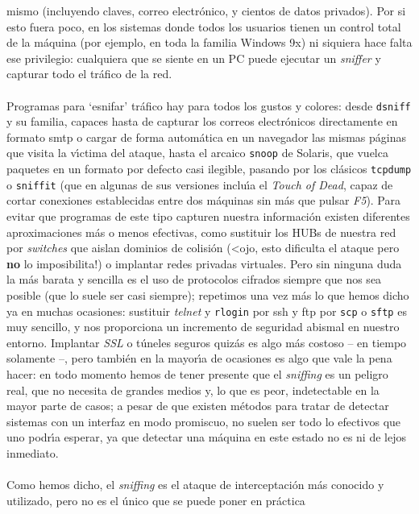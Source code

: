mismo (incluyendo claves, correo electr\'onico, y cientos de datos privados). 
Por si esto fuera poco, en los sistemas donde todos los usuarios tienen un 
control total de la m\'aquina (por ejemplo, en toda la familia Windows 9x) ni 
siquiera hace falta ese privilegio: cualquiera que se siente en un PC puede
ejecutar un {\it sniffer} y capturar todo el tr\'afico de la red.\\
\\Programas para `esnifar' tr\'afico hay para todos los gustos y colores: desde
{\tt dsniff} y su familia, capaces hasta de capturar los correos electr\'onicos
directamente en formato {\sc smtp} o cargar de forma autom\'atica en un 
navegador las mismas p\'aginas que visita
la v\'{\i}ctima del ataque, hasta el arcaico {\tt snoop} de Solaris, que vuelca
paquetes en un formato por defecto casi ilegible, pasando por los cl\'asicos
{\tt tcpdump} o {\tt sniffit} (que en algunas de sus versiones inclu\'{\i}a el
{\it Touch of Dead}, capaz de cortar conexiones establecidas entre dos 
m\'aquinas sin m\'as que pulsar {\it F5}). Para evitar que programas de este
tipo capturen nuestra informaci\'on existen diferentes aproximaciones m\'as o
menos efectivas, como sustituir los HUBs de nuestra red por {\it switches} que
aislan dominios de colisi\'on (<ojo, esto dificulta el ataque pero {\bf no} lo
imposibilita!) o implantar redes privadas virtuales. Pero sin ninguna duda la 
m\'as barata y sencilla es el uso de protocolos cifrados siempre que nos sea
posible (que lo suele ser casi siempre); repetimos una vez m\'as lo que hemos
dicho ya en muchas ocasiones: sustituir {\it telnet} y {\tt rlogin} por {\sc
ssh} y {\sc ftp} por {\tt scp} o {\tt sftp} es muy sencillo, y nos proporciona 
un incremento de seguridad abismal en nuestro entorno. Implantar {\it SSL} o
t\'uneles seguros quiz\'as es algo m\'as costoso -- en tiempo solamente --, 
pero tambi\'en en la mayor\'{\i}a de ocasiones es algo que vale la pena hacer:
en todo momento hemos de tener presente que el {\it sniffing} es un peligro 
real, que no necesita de grandes medios y, lo que es peor, indetectable en 
la mayor parte de casos; a pesar de que existen m\'etodos para tratar de 
detectar sistemas con un interfaz en modo promiscuo, no suelen ser todo lo 
efectivos que uno podr\'{\i}a esperar, ya que detectar una m\'aquina en este
estado no es ni de lejos inmediato.\\
\\Como hemos dicho, el {\it sniffing} es el ataque de interceptaci\'on m\'as
conocido y utilizado, pero no es el \'unico que se puede poner en pr\'actica
